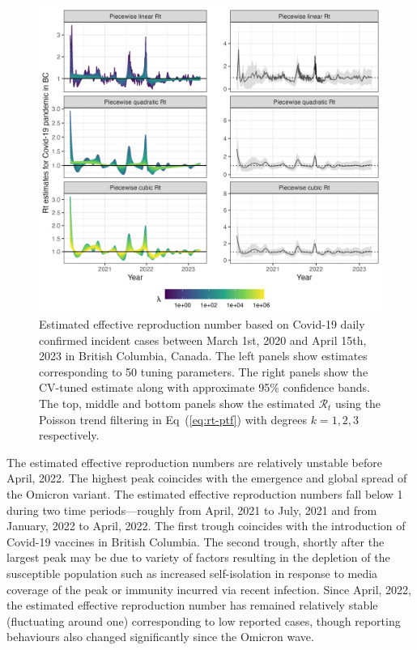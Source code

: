 \documentclass[10pt,letterpaper]{article}
\def\calR{\mathcal{R}}
\renewcommand{\eqref}[1]{Eq~(\ref{#1})}
\begin{document}
\begin{figure}[!h]
  \centering
  \includegraphics[width=0.9\linewidth]{fig/covid_full_res.png}
  \caption{Estimated effective reproduction number based on Covid-19 daily
  confirmed incident cases between March 1st, 2020 and April 15th, 2023 in
  British Columbia, Canada. The left panels show estimates corresponding to 50
  tuning parameters. The right panels show the CV-tuned estimate along with
  approximate 95\% confidence bands. The top, middle and bottom panels show the
  estimated $\calR_t$ using the Poisson trend filtering in \eqref{eq:rt-ptf}
  with degrees $k=1,2,3$ respectively.} 
  \label{fig:covid-rt}
\end{figure} 

The estimated effective reproduction numbers are relatively unstable before April,
2022. The highest peak coincides with the emergence and global spread of the
Omicron variant. The estimated effective reproduction numbers fall below 1 during two time
periods---roughly from April, 2021 to July, 2021 and from January,
2022 to April, 2022. The first trough coincides with the introduction of
Covid-19 vaccines in British Columbia. The second trough, shortly after the
largest peak may be due to variety of factors resulting in the depletion of the
susceptible population such as increased self-isolation in response to media
coverage of the peak or immunity incurred via recent infection. Since April,
2022, the estimated effective reproduction number has remained relatively stable
(fluctuating around one) corresponding to low reported cases, though reporting
behaviours also changed significantly since the Omicron wave. 
\end{document}
